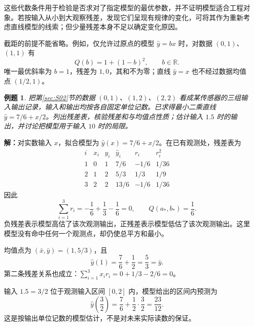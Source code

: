 \documentclass[UTF8,fontset=fandol,11pt]{ctexart}
\newtheorem{example}[definition]{例题}
\begin{document}
这些代数条件用于检验是否求对了指定模型的最优参数，并不证明模型适合工程对象。若按输入从小到大观察残差，发现它们呈现有规律的变化，可将其作为重新考虑直线模型的线索；但少量残差本身不足以确定变化原因。

截距的前提不能省略。例如，仅允许过原点的模型 $\hat{y}=bx$ 时，对数据 $(0,1)$、$(1,1)$ 有
\[
Q(b)=1+(1-b)^2,\qquad b\in\mathbb{R}.
\]
唯一最优斜率为 $b=1$，残差为 $1,0$，其和不为零；直线 $\hat{y}=x$ 也不经过数据均值点 $(1/2,1)$。\par
\begin{example}
把第\ref{sec:S02}节的数据 $(0,1)$、$(1,2)$、$(2,2)$ 看成某传感器的三组输入输出记录，输入和输出均按各自固定单位记数。已求得最小二乘直线 $\hat{y}=7/6+x/2$。列出残差表，核验残差和与均值点性质；估计输入 $1.5$ 时的输出，并讨论把模型用于输入 $10$ 时的局限。
\end{example}
\par\noindent\textbf{解：}对实数输入 $x$，拟合模型为 $\hat{y}(x)=7/6+x/2$。在已有观测处，残差表为
\[
\begin{array}{c|r|r|r|r|r}
i&x_i&y_i&\hat{y}_i&r_i&r_i^2\\ \hline
1&0&1&7/6&-1/6&1/36\\
2&1&2&5/3&1/3&1/9\\
3&2&2&13/6&-1/6&1/36
\end{array}
\]
因此
\[
\sum_{i=1}^{3}r_i=-\frac16+\frac13-\frac16=0,
\qquad Q(a_*,b_*)=\frac16.
\]
负残差表示模型高估了该次观测输出，正残差表示模型低估了该次观测输出。这里模型没有命中任何一个观测点，却仍使总平方和最小。

均值点为 $(\bar{x},\bar{y})=(1,5/3)$，且
\[
\hat{y}(1)=\frac76+\frac12=\frac53=\bar{y}.
\]
第二条残差关系也成立：$\sum_{i=1}^{3}x_i r_i=0+1/3-2/6=0$。

输入 $1.5=3/2$ 位于观测输入区间 $[0,2]$ 内，模型给出的区间内预测为
\[
\hat{y}\left(\frac32\right)=\frac76+\frac12\cdot\frac32
=\frac{23}{12}.
\]
这是按输出单位记数的模型估计，不是对未来实际读数的保证。
\end{document}
